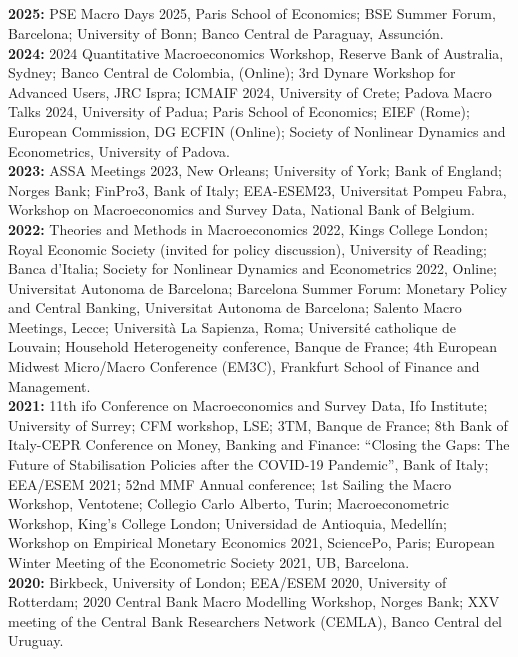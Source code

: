 \documentclass[margin, 11pt]{res} %
\begin{document}
\begin{resume}
\section{}
\textbf{2025:} {PSE Macro Days 2025, Paris School of Economics; BSE Summer Forum, Barcelona; University of Bonn; Banco Central de Paraguay, Assunción.}
\\
\textbf{2024:} {2024 Quantitative Macroeconomics Workshop, Reserve Bank of Australia, Sydney; Banco Central de Colombia, (Online); 3rd Dynare Workshop for Advanced Users, JRC Ispra; ICMAIF 2024, University of Crete; Padova Macro Talks 2024, University of Padua; Paris School of Economics; EIEF (Rome); European Commission, DG ECFIN (Online); Society of Nonlinear Dynamics and Econometrics, University of Padova.}
\\
\textbf{2023:} {ASSA Meetings 2023, New Orleans; University of York; Bank of England; Norges Bank; FinPro3, Bank of Italy; EEA-ESEM23, Universitat Pompeu Fabra, Workshop on Macroeconomics and Survey Data, National Bank of Belgium.}
\\
\textbf{2022:} {Theories and Methods in Macroeconomics 2022, Kings College London; Royal Economic Society (invited for policy discussion), University of Reading; Banca d'Italia; Society for Nonlinear Dynamics and Econometrics 2022, Online; Universitat Autonoma de Barcelona; Barcelona Summer Forum: Monetary Policy and Central Banking, Universitat Autonoma de Barcelona; Salento Macro Meetings, Lecce; Universit\`{a} La Sapienza, Roma; Universit\'{e} catholique de Louvain; Household Heterogeneity conference, Banque de France; 4th European Midwest Micro/Macro Conference (EM3C), Frankfurt School of Finance and Management.}
\\
\textbf{2021:} {11th ifo Conference on Macroeconomics and Survey Data, Ifo Institute; University of Surrey; CFM workshop, LSE; 3TM, Banque de France; 8th Bank of Italy-CEPR Conference on Money, Banking and Finance: “Closing the Gaps: The Future of Stabilisation Policies after the COVID-19 Pandemic”, Bank of Italy; EEA/ESEM 2021; 52nd MMF Annual conference; 1st Sailing the Macro Workshop, Ventotene; Collegio Carlo Alberto, Turin; Macroeconometric Workshop, King's College London; Universidad de Antioquia, Medell\'{i}n; Workshop on Empirical Monetary Economics 2021, SciencePo, Paris; European Winter Meeting of the Econometric Society 2021, UB, Barcelona.}
\\
\textbf{2020:} {Birkbeck, University of London; EEA/ESEM 2020, University of Rotterdam; 2020 Central Bank Macro Modelling Workshop, Norges Bank; XXV meeting of the Central Bank Researchers Network (CEMLA), Banco Central del Uruguay.}

\end{resume}
\end{document}
